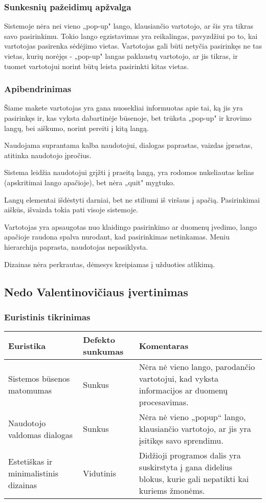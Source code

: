 \documentclass{VUMIFPSkursinis}
\begin{document}
\subsubsection{Sunkesnių pažeidimų apžvalga}
Sistemoje nėra nei vieno „pop-up" lango, klausiančio vartotojo, ar šis yra tikras savo pasirinkimu. Tokio lango egzistavimas yra reikalingas, pavyzdžiui po to, kai vartotojas pasirenka sėdėjimo vietas. Vartotojas gali būti netyčia pasirinkęs ne tas vietas, kurių norėjęs - „pop-up" langas paklaustų vartotojo, ar jis tikras, ir tuomet vartotojui norint būtų leista pasirinkti kitas vietas.

\subsubsection{Apibendrinimas}
Šiame makete vartotojas yra gana nuosekliai informuotas apie tai, ką jis yra pasirinkęs ir, kas vyksta dabartinėje būsenoje, bet trūksta „pop-up" ir krovimo langų, bei aiškumo, norint pereiti į kitą langą.

Naudojama suprantama kalba naudotojui, dialogas paprastas, vaizdas įprastas, atitinka naudotojo įpročius.

Sistema leidžia naudotojui grįžti į praeitą langą, yra rodomos nukeliautas kelias (apskritimai lango apačioje), bet nėra „quit" mygtuko.

Langų elementai išdėstyti darniai, bet ne stiliumi iš viršaus į apačią. Pasirinkimai aiškūs, išvaizda tokia pati visoje sistemoje.

Vartotojas yra apsaugotas nuo klaidingo pasirinkimo ar duomenų įvedimo, lango apačioje raudona spalva nurodant, kad pasirinkimas netinkamas. Meniu hierarchija paprasta, naudotojas nepasiklysta.

Dizainas nėra perkrautas, dėmesys kreipiamas į užduoties atlikimą.

\subsection{Nedo Valentinovičiaus įvertinimas}
\subsubsection{Euristinis tikrinimas}
\begin{center}
 \begin{tabular}{|| p{4cm} | p{4cm} | p{8cm} ||} 
 \hline
 Euristika & Defekto sunkumas & Komentaras \\
 \hline\hline
 Sistemos būsenos matomumas & Sunkus & Nėra nė vieno lango, parodančio vartotojui, kad vyksta informacijos ar duomenų procesavimas. \\ 
 \hline
 Naudotojo valdomas dialogas & Sunkus & Nėra nė vieno „popup“ lango, klausiančio vartotojo, ar jis yra įsitikęs savo sprendimu. \\ 
 \hline
 Estetiškas ir minimalistinis dizainas & Vidutinis & Didžioji programos dalis yra suskirstyta į gana didelius blokus, kurie gali nepatikti kai kuriems žmonėms. \\ 
 \hline
\end{tabular}	
\end{center}
\end{document}
